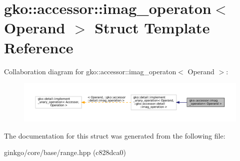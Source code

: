 \hypertarget{structgko_1_1accessor_1_1imag__operaton}{}\section{gko\+:\+:accessor\+:\+:imag\+\_\+operaton$<$ Operand $>$ Struct Template Reference}
\label{structgko_1_1accessor_1_1imag__operaton}


Collaboration diagram for gko\+:\+:accessor\+:\+:imag\+\_\+operaton$<$ Operand $>$\+:
\nopagebreak
\begin{figure}[H]
\begin{center}
\leavevmode
\includegraphics[width=350pt]{structgko_1_1accessor_1_1imag__operaton__coll__graph}
\end{center}
\end{figure}


The documentation for this struct was generated from the following file\+:\begin{DoxyCompactItemize}
\item 
ginkgo/core/base/range.\+hpp (c828dca0)\end{DoxyCompactItemize}
